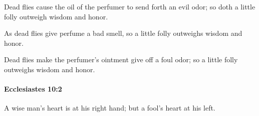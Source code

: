 			\begin{versebox}
					\item[BHS] 
					\item[LXX] 
					\item[ASV] Dead flies cause the oil of the perfumer to send forth an evil odor; so doth a little folly outweigh wisdom and honor.
					\item[NIV] As dead flies give perfume a bad smell, so a little folly outweighs wisdom and honor.
					\item[NRSV] Dead flies make the perfumer’s ointment give off a foul odor; so a little folly outweighs wisdom and honor.
			\end{versebox}

		\paragraph{Ecclesiastes 10:2} %
			\label{ECCLESIASTES-10-2}

			A wise man’s heart is at his right hand; but a fool’s heart at his left.


